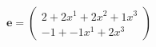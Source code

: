 \documentclass[preview]{standalone}
\begin{document}
\begin{align*}
\mathbf{e} = \begin{pmatrix}2 + 2x^{1} + 2x^{2} + 1x^{3} \\ -1 + -1x^{1} + 2x^{3}\end{pmatrix}
\end{align*}
\end{document}
